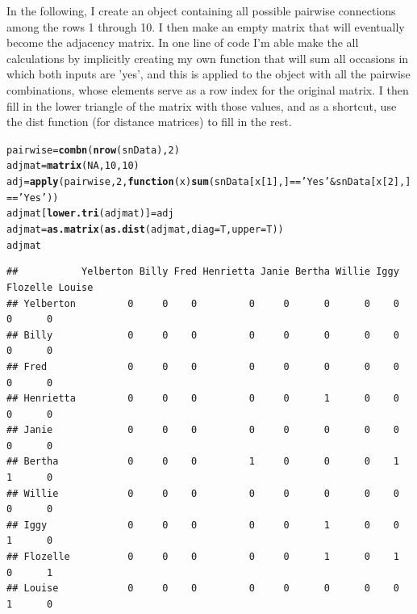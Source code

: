 \documentclass[english,nohyper,titlepage]{tufte-handout}\usepackage[]{graphicx}\usepackage[]{color}
\makeatletter
\newcommand{\hlnum}[1]{\textcolor[rgb]{0.686,0.059,0.569}{#1}}%
\newcommand{\hlstr}[1]{\textcolor[rgb]{0.192,0.494,0.8}{#1}}%
\newcommand{\hlopt}[1]{\textcolor[rgb]{0,0,0}{#1}}%
\newcommand{\hlstd}[1]{\textcolor[rgb]{0.345,0.345,0.345}{#1}}%
\newcommand{\hlkwa}[1]{\textcolor[rgb]{0.161,0.373,0.58}{\textbf{#1}}}%
\newcommand{\hlkwb}[1]{\textcolor[rgb]{0.69,0.353,0.396}{#1}}%
\newcommand{\hlkwc}[1]{\textcolor[rgb]{0.333,0.667,0.333}{#1}}%
\newcommand{\hlkwd}[1]{\textcolor[rgb]{0.737,0.353,0.396}{\textbf{#1}}}%
\newenvironment{kframe}{%
 \def\at@end@of@kframe{}%
 \ifinner\ifhmode%
  \def\at@end@of@kframe{\end{minipage}}%
  \begin{minipage}{\columnwidth}%
 \fi\fi%
 \def\FrameCommand##1{\hskip\@totalleftmargin \hskip-\fboxsep
 \colorbox{shadecolor}{##1}\hskip-\fboxsep
     \hskip-\linewidth \hskip-\@totalleftmargin \hskip\columnwidth}%
 \MakeFramed {\advance\hsize-\width
   \@totalleftmargin\z@ \linewidth\hsize
   \@setminipage}}%
 {\par\unskip\endMakeFramed%
 \at@end@of@kframe}
\newenvironment{knitrout}{}{} %
\makeatother
\begin{document}
In the following, I create an object containing all possible pairwise connections among the rows 1 through 10. I then make an empty matrix that will eventually become the adjacency matrix. In one line of code I'm able make the all calculations by implicitly creating my own function that will sum all occasions in which both inputs are 'yes', and this is applied to the object with all the pairwise combinations, whose elements serve as a row index for the original matrix.  I then fill in the lower triangle of the matrix with those values, and as a shortcut, use the dist function (for distance matrices) to fill in the rest.


\begin{knitrout}\footnotesize
{}\color{fgcolor}\begin{kframe}
\begin{alltt}
\hlstd{pairwise} \hlkwb{=} \hlkwd{combn}\hlstd{(}\hlkwd{nrow}\hlstd{(snData),} \hlnum{2}\hlstd{)}
\hlstd{adjmat} \hlkwb{=} \hlkwd{matrix}\hlstd{(}\hlnum{NA}\hlstd{,} \hlnum{10}\hlstd{,} \hlnum{10}\hlstd{)}
\hlstd{adj} \hlkwb{=} \hlkwd{apply}\hlstd{(pairwise,} \hlnum{2}\hlstd{,} \hlkwa{function}\hlstd{(}\hlkwc{x}\hlstd{)} \hlkwd{sum}\hlstd{(snData[x[}\hlnum{1}\hlstd{],]}\hlopt{==}\hlstr{'Yes'} \hlopt{&} \hlstd{snData[x[}\hlnum{2}\hlstd{],]}\hlopt{==}\hlstr{'Yes'}\hlstd{))}
\hlstd{adjmat[}\hlkwd{lower.tri}\hlstd{(adjmat)]} \hlkwb{=} \hlstd{adj}
\hlstd{adjmat} \hlkwb{=} \hlkwd{as.matrix}\hlstd{(}\hlkwd{as.dist}\hlstd{(adjmat,} \hlkwc{diag}\hlstd{=T,} \hlkwc{upper}\hlstd{=T))}
\hlstd{adjmat}
\end{alltt}
\begin{verbatim}
##           Yelberton Billy Fred Henrietta Janie Bertha Willie Iggy Flozelle Louise
## Yelberton         0     0    0         0     0      0      0    0        0      0
## Billy             0     0    0         0     0      0      0    0        0      0
## Fred              0     0    0         0     0      0      0    0        0      0
## Henrietta         0     0    0         0     0      1      0    0        0      0
## Janie             0     0    0         0     0      0      0    0        0      0
## Bertha            0     0    0         1     0      0      0    1        1      0
## Willie            0     0    0         0     0      0      0    0        0      0
## Iggy              0     0    0         0     0      1      0    0        1      0
## Flozelle          0     0    0         0     0      1      0    1        0      1
## Louise            0     0    0         0     0      0      0    0        1      0
\end{verbatim}
\end{kframe}
\end{knitrout}
\end{document}
